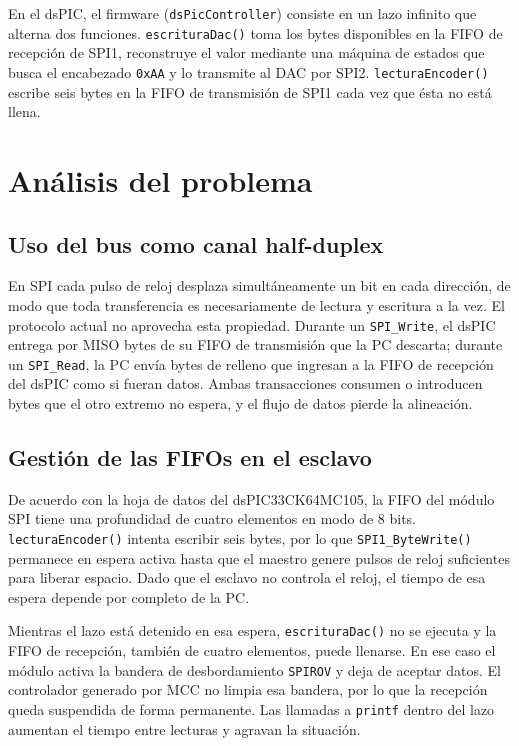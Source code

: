 \documentclass[11pt]{article}
\newcommand{\code}[1]{\texttt{#1}}
\begin{document}
En el dsPIC, el firmware (\code{dsPicController}) consiste en un lazo infinito
que alterna dos funciones. \code{escrituraDac()} toma los bytes disponibles en
la FIFO de recepción de SPI1, reconstruye el valor mediante una máquina de
estados que busca el encabezado \code{0xAA} y lo transmite al DAC por SPI2.
\code{lecturaEncoder()} escribe seis bytes en la FIFO de transmisión de SPI1
cada vez que ésta no está llena.

\section{Análisis del problema}

\subsection{Uso del bus como canal half-duplex}

En SPI cada pulso de reloj desplaza simultáneamente un bit en cada dirección,
de modo que toda transferencia es necesariamente de lectura y escritura a la
vez. El protocolo actual no aprovecha esta propiedad. Durante un
\code{SPI\_Write}, el dsPIC entrega por MISO bytes de su FIFO de transmisión
que la PC descarta; durante un \code{SPI\_Read}, la PC envía bytes de relleno
que ingresan a la FIFO de recepción del dsPIC como si fueran datos. Ambas
transacciones consumen o introducen bytes que el otro extremo no espera, y el
flujo de datos pierde la alineación.

\subsection{Gestión de las FIFOs en el esclavo}

De acuerdo con la hoja de datos del dsPIC33CK64MC105, la FIFO del módulo SPI
tiene una profundidad de cuatro elementos en modo de 8 bits.
\code{lecturaEncoder()} intenta escribir seis bytes, por lo que
\code{SPI1\_ByteWrite()} permanece en espera activa hasta que el maestro genere
pulsos de reloj suficientes para liberar espacio. Dado que el esclavo no
controla el reloj, el tiempo de esa espera depende por completo de la PC.

Mientras el lazo está detenido en esa espera, \code{escrituraDac()} no se
ejecuta y la FIFO de recepción, también de cuatro elementos, puede llenarse.
En ese caso el módulo activa la bandera de desbordamiento \code{SPIROV} y deja
de aceptar datos. El controlador generado por MCC no limpia esa bandera, por
lo que la recepción queda suspendida de forma permanente. Las llamadas a
\code{printf} dentro del lazo aumentan el tiempo entre lecturas y agravan la
situación.
\end{document}
